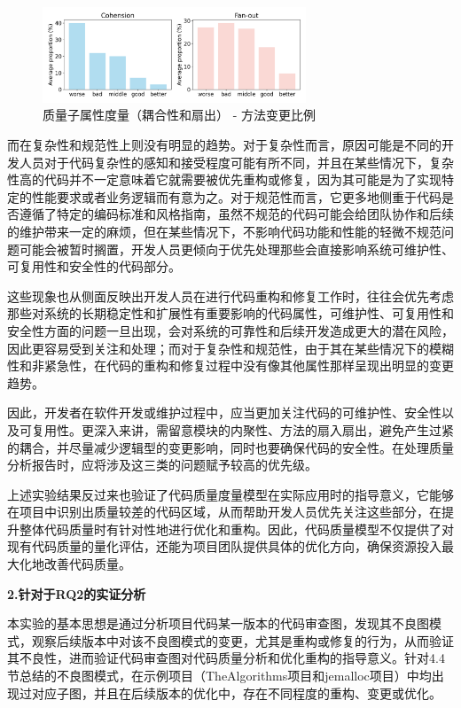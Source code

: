 \begin{figure}[h]
\centering
\includegraphics[width = 0.7\textwidth]{figures/4_子属性.jpg}
\caption{质量子属性度量（耦合性和扇出） - 方法变更比例}
\label{4_子属性}
\end{figure}

而在复杂性和规范性上则没有明显的趋势。对于复杂性而言，原因可能是不同的开发人员对于代码复杂性的感知和接受程度可能有所不同，并且在某些情况下，复杂性高的代码并不一定意味着它就需要被优先重构或修复，因为其可能是为了实现特定的性能要求或者业务逻辑而有意为之。对于规范性而言，它更多地侧重于代码是否遵循了特定的编码标准和风格指南，虽然不规范的代码可能会给团队协作和后续的维护带来一定的麻烦，但在某些情况下，不影响代码功能和性能的轻微不规范问题可能会被暂时搁置，开发人员更倾向于优先处理那些会直接影响系统可维护性、可复用性和安全性的代码部分。

这些现象也从侧面反映出开发人员在进行代码重构和修复工作时，往往会优先考虑那些对系统的长期稳定性和扩展性有重要影响的代码属性，可维护性、可复用性和安全性方面的问题一旦出现，会对系统的可靠性和后续开发造成更大的潜在风险，因此更容易受到关注和处理；而对于复杂性和规范性，由于其在某些情况下的模糊性和非紧急性，在代码的重构和修复过程中没有像其他属性那样呈现出明显的变更趋势。

因此，开发者在软件开发或维护过程中，应当更加关注代码的可维护性、安全性以及可复用性。更深入来讲，需留意模块的内聚性、方法的扇入扇出，避免产生过紧的耦合，并尽量减少逻辑型的变更影响，同时也要确保代码的安全性。在处理质量分析报告时，应将涉及这三类的问题赋予较高的优先级。

上述实验结果反过来也验证了代码质量度量模型在实际应用时的指导意义，它能够在项目中识别出质量较差的代码区域，从而帮助开发人员优先关注这些部分，在提升整体代码质量时有针对性地进行优化和重构。因此，代码质量模型不仅提供了对现有代码质量的量化评估，还能为项目团队提供具体的优化方向，确保资源投入最大化地改善代码质量。

\textbf{2.针对于RQ2的实证分析}

本实验的基本思想是通过分析项目代码某一版本的代码审查图，发现其不良图模式，观察后续版本中对该不良图模式的变更，尤其是重构或修复的行为，从而验证其不良性，进而验证代码审查图对代码质量分析和优化重构的指导意义。针对4.4节总结的不良图模式，在示例项目（TheAlgorithms项目和jemalloc项目）中均出现过对应子图，并且在后续版本的优化中，存在不同程度的重构、变更或优化。


